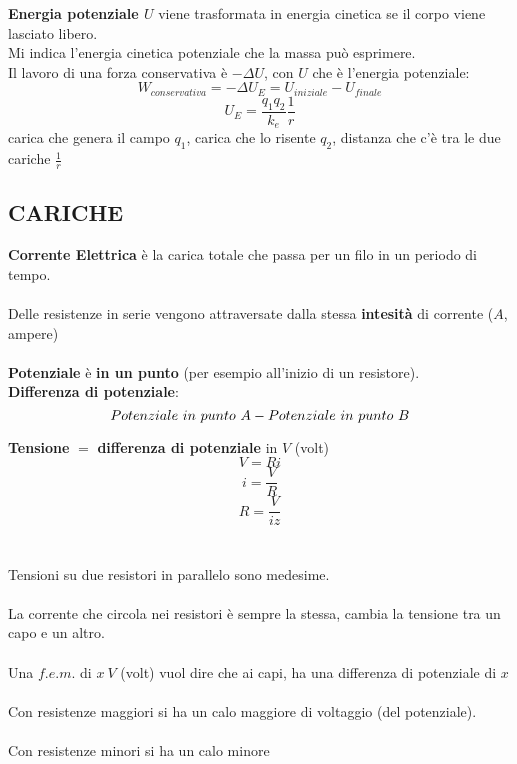 \documentclass{article}
\begin{document}
\textbf{Energia potenziale $U$} viene trasformata in energia cinetica se il corpo viene lasciato libero.\\
Mi indica l'energia cinetica potenziale che la massa può esprimere.\\
Il lavoro di una forza conservativa è $-\Delta U$, con $U$ che è l'energia potenziale:
\begin{equation*}
  W_{conservativa}=-\Delta U_E=U_{iniziale}-U_{finale}
\end{equation*}
\begin{equation*}
  U_E=\frac{q_1q_2}{k_e}\frac{1}{r}
\end{equation*} carica che genera il campo $q_1$, carica che lo risente $q_2$, distanza che c'è tra le due cariche $\frac{1}{r}$

\subsection{CARICHE}

\textbf{Corrente Elettrica} è la carica totale che passa per un filo in un periodo di tempo.
\\\\
Delle resistenze in serie vengono attraversate dalla stessa \textbf{intesità} di corrente ($A$, ampere)
\\\\
\textbf{Potenziale} è \textbf{in un punto} (per esempio all'inizio di un resistore).\\

\textbf{Differenza di potenziale}:
\begin{equation*}
  Potenziale\ in\ punto\ A - Potenziale\ in\ punto\ B\\
\end{equation*}

\textbf{Tensione} $=$ \textbf{differenza di potenziale} in $V$ (volt)
\begin{equation*}
  V=Ri
\end{equation*}
\begin{equation*}
    i=\frac{V}{R}
\end{equation*}
\begin{equation*}
  R=\frac{V}{iz}
\end{equation*}
\\\\
Tensioni su due resistori in parallelo sono medesime.
\\\\
La corrente che circola nei resistori è sempre la stessa, cambia la tensione tra un capo e un altro.
\\\\
Una $f.e.m.$ di $x\ V$ (volt) vuol dire che ai capi, ha una differenza di potenziale di $x$
\\\\
Con resistenze maggiori si ha un calo maggiore di voltaggio (del potenziale).
\\\\
Con resistenze minori si ha un calo minore
\end{document}
